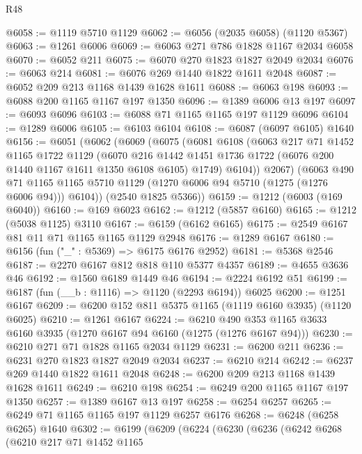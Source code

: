 \begin{lexlean}{R48}
\begin{coremodule}
@6058 := @1119 @5710 @1129
@6062 := @6056 (@2035 @6058) (@1120 @5367)
@6063 := @1261 @6006
@6069 := @6063 @271 @786 @1828 @1167 @2034 @6058
@6070 := @6052 @211
@6075 := @6070 @270 @1823 @1827 @2049 @2034
@6076 := @6063 @214
@6081 := @6076 @269 @1440 @1822 @1611 @2048
@6087 := @6052 @209 @213 @1168 @1439 @1628 @1611
@6088 := @6063 @198
@6093 := @6088 @200 @1165 @1167 @197 @1350
@6096 := @1389 @6006 @13 @197
@6097 := @6093 @6096
@6103 := @6088 @71 @1165 @1165 @197 @1129 @6096
@6104 := @1289 @6006
@6105 := @6103 @6104
@6108 := @6087 (@6097 @6105) @1640
@6156 := @6051
    (@6062
      (@6069
        (@6075
          (@6081
            @6108
            (@6063
              @217
              @71
              @1452
              @1165
              @1722
              @1129
              (@6070
                @216
                @1442
                @1451
                @1736
                @1722
                (@6076 @200 @1440 @1167 @1611 @1350 @6108 @6105)
                @1749)
              @6104))
          @2067)
        (@6063
          @490
          @71
          @1165
          @1165
          @5710
          @1129
          (@1270 @6006 @94 @5710 (@1275 (@1276 @6006 @94)))
          @6104))
      (@2540 @1825 @5366))
@6159 := @1212 (@6003 (@169 @6040))
@6160 := @169 @6023
@6162 := @1212 (@5857 @6160)
@6165 := @1212 (@5038 @1125) @3110
@6167 := @6159 (@6162 @6165)
@6175 := @2549 @6167 @81 @11 @71 @1165 @1165 @1129 @2948
@6176 := @1289 @6167
@6180 := @6156 (fun ("_" : @5369) => @6175 @6176 @2952)
@6181 := @5368 @2546
@6187 := @2270 @6167 @812 @818 @110 @5377 @4357
@6189 := @4655 @3636 @46
@6192 := @1560 @6189 @1449 @46
@6194 := @2224 @6192 @51
@6199 := @6187 (fun (__b : @1116) => @1120 (@2293 @6194)) @6025
@6200 := @1251 @6167
@6209 := @6200 @152 @811 @5375 @1165 (@1119 @6160 @3935) (@1120 @6025)
@6210 := @1261 @6167
@6224 := @6210 @490 @353 @1165 @3633 @6160 @3935 (@1270 @6167 @94 @6160 (@1275 (@1276 @6167 @94)))
@6230 := @6210 @271 @71 @1828 @1165 @2034 @1129
@6231 := @6200 @211
@6236 := @6231 @270 @1823 @1827 @2049 @2034
@6237 := @6210 @214
@6242 := @6237 @269 @1440 @1822 @1611 @2048
@6248 := @6200 @209 @213 @1168 @1439 @1628 @1611
@6249 := @6210 @198
@6254 := @6249 @200 @1165 @1167 @197 @1350
@6257 := @1389 @6167 @13 @197
@6258 := @6254 @6257
@6265 := @6249 @71 @1165 @1165 @197 @1129 @6257 @6176
@6268 := @6248 (@6258 @6265) @1640
@6302 := @6199
    (@6209
      (@6224
        (@6230
          (@6236
            (@6242
              @6268
              (@6210
                @217
                @71
                @1452
                @1165

\end{coremodule}
\end{lexlean}
